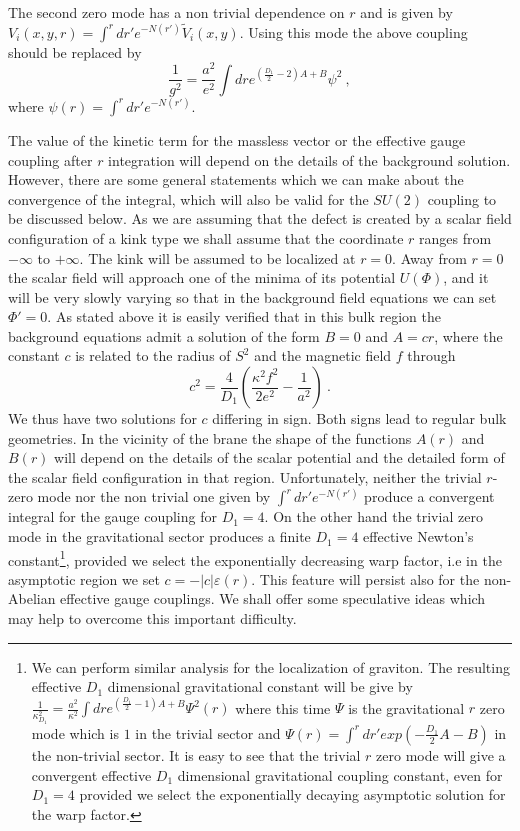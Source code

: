 \documentclass[a4paper,12pt]{article}
\begin{document}
The second zero mode has a non trivial dependence on $r$ and is
given by $V_i (x, y, r)= \int^r dr' e^{ - N(r')}\tilde V_i (x, y)$.
Using this mode the above coupling should be replaced by
\begin{equation}
\frac{1}{g^2}=\frac{a^2}{e^2}\int dr e^{(\frac{D_1}{2}-2)A+B}\psi^2~,
\end{equation}
where $\psi(r) = \int^r dr'e^{- N(r')}$.

The value of the kinetic term for the massless vector or the
effective gauge coupling after $r$ integration will depend on the
details of the background solution. However, there are some general
statements which we can make about the convergence of the integral,
which will also be valid for the $SU(2)$ coupling to be discussed
below. As we are assuming that the defect is created by a scalar
field configuration of a kink type we shall assume that the
coordinate $r$ ranges from $-\infty$ to $+\infty$. The kink will be
assumed to be localized at $r=0$. Away from $r=0$ the scalar field
will approach one of the minima of its potential $U(\Phi)$, and it
will be very slowly varying so that in the background field equations
we can set $\Phi'=0$. As stated above it is easily verified that in
this bulk region the background equations admit a solution of the
form $B=0$ and $A= cr$, where the constant $c$ is related to the
radius of $S^2$ and the magnetic field $f$ through
\begin{equation}
 c^2 = \frac{4}{D_1} \left(\frac{\kappa^2 f^2}{2e^2}-
\frac{1}{a^2}\right)~.
\end{equation}
We thus have two solutions for $c$ differing in sign. Both signs lead
to regular bulk geometries. In the vicinity of the brane the shape of
the functions $A(r)$ and $B(r)$ will depend on the details of the
scalar potential and the detailed form of the scalar field
configuration in that region. Unfortunately, neither the trivial
$r$-zero mode nor the non trivial one given by $\int^r dr' e^{ -
N(r')}$ produce a convergent integral for the gauge coupling for
$D_1=4$. On the other hand the trivial zero mode in the gravitational
sector produces a finite $D_1=4$ effective Newton's
constant\footnote{We can perform similar analysis for the
localization of graviton. The resulting effective $D_1$ dimensional
gravitational constant will be give by $\frac{1}{\kappa_{D_1} ^{2}} =
\frac{a^2}{\kappa^2}\int dr e^{( \frac{D_1}{2}-1)A +B} \Psi^2(r)$
where this time $\Psi$ is the gravitational $r$ zero mode which is
$1$ in the trivial sector and $\Psi (r)= \int^r dr' exp \left( -
\frac{D_1}{2}A-B\right)$ in the non-trivial sector. It is easy to see
that the trivial $r$ zero mode will give a convergent effective $D_1$
dimensional gravitational coupling constant, even for $D_1=4$
provided we select the exponentially decaying asymptotic solution for
the warp factor.}, provided we select the exponentially decreasing
warp factor, i.e in the asymptotic region we set $c= -|c|\varepsilon
(r)$. This feature will persist also for the non-Abelian effective
gauge couplings. We shall offer some speculative ideas which may help
to overcome this important difficulty.
\end{document}
